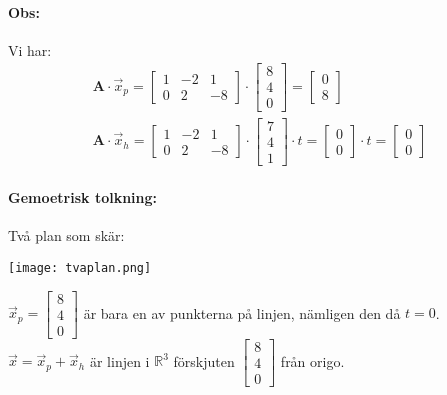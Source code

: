 \paragraph{Obs:} %
\label{par:obs_}
Vi har:
\begin{gather*}
    \mathbf{A} \cdot \vec{x}_p = \begin{bmatrix} 1 & -2 & 1\\0 & 2 & -8 \end{bmatrix} \cdot \begin{bmatrix} 8\\4\\0 \end{bmatrix} = \begin{bmatrix} 0\\8 \end{bmatrix}\\
    \mathbf{A} \cdot \vec{x}_h = \begin{bmatrix} 1 & -2 & 1\\0 & 2 & -8 \end{bmatrix} \cdot \begin{bmatrix} 7\\4\\1 \end{bmatrix} \cdot t = \begin{bmatrix} 0\\0 \end{bmatrix} \cdot t = \begin{bmatrix} 0\\0 \end{bmatrix}
\end{gather*}
\paragraph{Gemoetrisk tolkning:} %
\label{par:gemoetrisk_tolkning_}
Två plan som skär:
\begin{center}
    \texttt{[image: tvaplan.png]}
\end{center}
$\vec{x}_p  = \begin{bmatrix} 8\\4\\0 \end{bmatrix}$ är bara en av punkterna på linjen, nämligen den då $t=0$.\\
$\vec{x} = \vec{x}_p + \vec{x}_h$ är linjen i $\mathbb{R}^3$ förskjuten $\begin{bmatrix} 8\\4\\0 \end{bmatrix}$ från origo.

